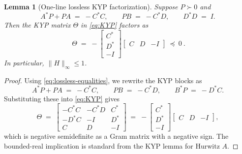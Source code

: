 \documentclass[11pt]{article}
\newtheorem{lemma}[theorem]{Lemma}
\theoremstyle{definition}
\theoremstyle{remark}
\begin{document}
\begin{lemma}[One-line lossless KYP factorization]\label{lem:losslessKYP}
Suppose \(P\succ 0\) and
\begin{equation}\label{eq:lossless-equalities}
 A^*P+PA\;=\;-C^*C,\qquad PB\;=\;-C^*D,\qquad D^*D\;=\;I.
\end{equation}
Then the KYP matrix \(\Theta\) in \eqref{eq:KYP} factors as
\begin{equation}\label{eq:one-line-factor}
 \boxed{\ \Theta\;=\;-\begin{bmatrix}C^*\\ D^*\\ -I\end{bmatrix}\!\begin{bmatrix}C & D & -I\end{bmatrix}\ \preceq\ 0\ }.
\end{equation}
In particular, \(\|H\|_\infty\le 1\).
\end{lemma}
\begin{proof}
Using \eqref{eq:lossless-equalities}, we rewrite the KYP blocks as
\[
 A^*P+PA\;=\;-C^*C,\qquad PB\;=\;-C^*D,\qquad B^*P\;=\;-D^*C.
\]
Substituting these into \eqref{eq:KYP} gives
\[
 \Theta\;=\;\begin{bmatrix}
  -C^*C & -C^*D & C^*\\
  -D^*C & -I & D^*\\
  C & D & -I
 \end{bmatrix}\;=\;-\begin{bmatrix}C^*\\ D^*\\ -I\end{bmatrix}\!\begin{bmatrix}C & D & -I\end{bmatrix},
\]
which is negative semidefinite as a Gram matrix with a negative sign. The bounded-real implication is standard from the KYP lemma for Hurwitz \(A\).
\end{proof}
\end{document}

